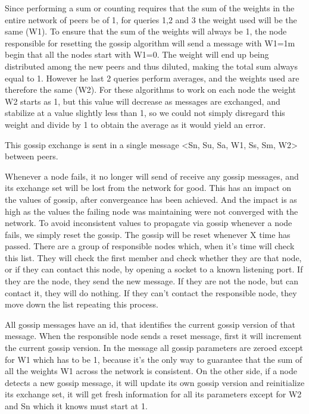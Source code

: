 \documentclass[times,9pt,article]{llncs}
\begin{document}
Since performing a sum or counting requires that the sum of the weights in the entire network of peers be of 1, for queries 1,2 and 3 the weight used will be the same (W1). To ensure that the sum of the weights will always be 1, the node responsible for resetting the gossip algorithm will send a message with W1=1m begin that all the nodes start with W1=0. The weight will end up being distributed among the new peers and thus diluted, making the total sum always equal to 1.
However he last 2 queries perform averages, and the weights used are therefore the same (W2). For these algorithms to work on each node the weight W2 starts as 1, but this value will decrease as messages are exchanged, and stabilize at a value slightly less than 1, so we could not simply disregard this weight and divide by 1 to obtain the average as it would yield an error.

This gossip exchange is sent in a single message <Sn, Su, Sa, W1, Ss, Sm, W2> between peers.

Whenever a node fails, it no longer will send of receive any gossip messages, and its exchange set will be lost from the network for good. This has an impact on the values of gossip, after convergeance has been achieved. And the impact is as high as the values the failing node was maintaining were not converged with the network. To avoid inconsistent values to propagate via gossip whenever a node fails, we simply reset the gossip. The gossip will be reset whenever X time has passed. There are a group of responsible nodes which, when it's time will check this list. They will check the first member and check whether they are that node, or if they can contact this node, by opening a socket to a known listening port. If they are the node, they send the new message. If they are not the node, but can contact it, they will do nothing. If they can't contact the responsible node, they move down the list repeating this process. 

All gossip messages have an id, that identifies the current gossip version of that message. When the responsible node sends a reset message, first it will increment the current gossip version. In the message all gossip parameters are zeroed except for W1 which has to be 1, because it's the only way to guarantee that the sum of all the weights W1 across the network is consistent. On the other side, if a node detects a new gossip message, it will update its own gossip version and reinitialize its exchange set, it will get fresh information for all its parameters except for W2 and Sn which it knows must start at 1.
\end{document}
